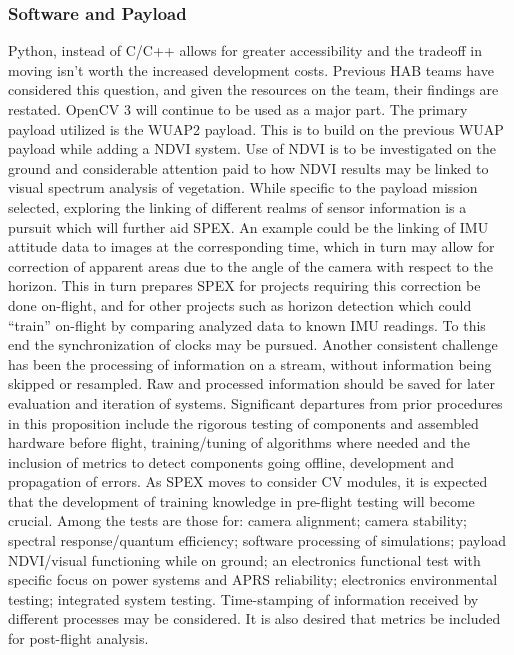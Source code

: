 \documentclass[conference]{IEEEtran} %
\begin{document}
\subsubsection{Software and Payload}
Python, instead of C/C++ allows for greater accessibility and the tradeoff in moving isn’t worth the increased development costs. Previous HAB teams have considered this question, and given the resources on the team, their findings are restated. OpenCV 3 will continue to be used as a major part.
The primary payload utilized is the WUAP2 payload. This is to build on the previous WUAP payload while adding a NDVI system. Use of NDVI is to be investigated on the ground and considerable attention paid to how NDVI results may be linked to visual spectrum analysis of vegetation. While specific to the payload mission selected, exploring the linking of different realms of sensor information is a pursuit which will further aid SPEX. An example could be the linking of IMU attitude data to images at the corresponding time, which in turn may allow for correction of apparent areas due to the angle of the camera with respect to the horizon. This in turn prepares SPEX for projects requiring this correction be done on-flight, and for other projects such as horizon detection which could “train” on-flight by comparing analyzed data to known IMU readings. To this end the synchronization of clocks may be pursued. Another consistent challenge has been the processing of information on a stream, without information being skipped or resampled. Raw and processed information should be saved for later evaluation and iteration of systems.
Significant departures from prior procedures in this proposition include the rigorous testing of components and assembled hardware before flight, training/tuning of algorithms where needed and the inclusion of metrics to detect components going offline, development and propagation of errors. As SPEX moves to consider CV modules, it is expected that the development of training knowledge in pre-flight testing will become crucial. Among the tests are those for: camera alignment; camera stability; spectral response/quantum efficiency; software processing of simulations; payload NDVI/visual functioning while on ground; an electronics functional test with specific focus on power systems and APRS reliability; electronics environmental testing; integrated system testing.  Time-stamping of information received by different processes may be considered. It is also desired that metrics be included for post-flight analysis.
\end{document}

